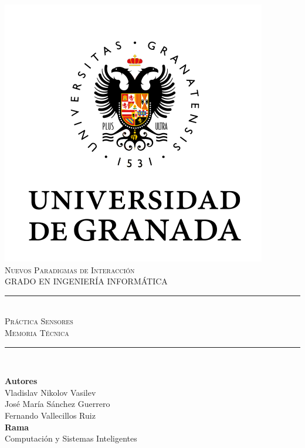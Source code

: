 \documentclass[11pt,a4paper]{article}
\newcommand{\asignatura}{Nuevos Paradigmas de Interacción}
\newcommand{\autorv}{Vladislav Nikolov Vasilev}
\newcommand{\autorj}{José María Sánchez Guerrero}
\newcommand{\autorf}{Fernando Vallecillos Ruiz}
\newcommand{\titulo}{Práctica Sensores}
\newcommand{\subtitulo}{Memoria Técnica}
\begin{document}

\begin{titlepage}

\begin{minipage}{\textwidth}

\centering

\includegraphics[scale=0.5]{img/ugr.png}\\

\textsc{\Large \asignatura{}\\[0.2cm]}
\textsc{GRADO EN INGENIERÍA INFORMÁTICA}\\[1cm]

\noindent\rule[-1ex]{\textwidth}{1pt}\\[1.5ex]
\textsc{{\Huge \titulo\\[0.5ex]}}
\textsc{{\Large \subtitulo\\}}
\noindent\rule[-1ex]{\textwidth}{2pt}\\[3.5ex]

\end{minipage}

\vspace{0.5cm}

\begin{minipage}{\textwidth}

\centering

\textbf{Autores}\\ {\autorv{}}\\{\autorj{}}\\{\autorf{}}\\[2.5ex]
\textbf{Rama}\\ {Computación y Sistemas Inteligentes}\\[2.5ex]
\vspace{0.3cm}


\end{minipage}
\end{titlepage}
\end{document}
